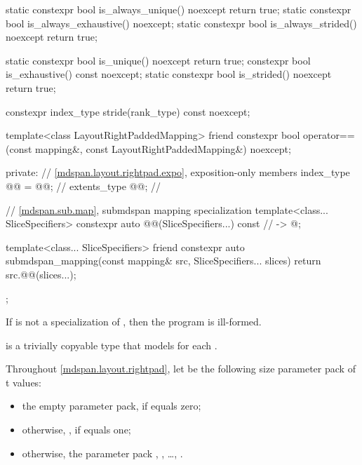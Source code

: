 \begin{codeblock}
{{    static constexpr bool is_always_unique() noexcept { return true; }
    static constexpr bool is_always_exhaustive() noexcept;
    static constexpr bool is_always_strided() noexcept { return true; }

    static constexpr bool is_unique() noexcept { return true; }
    constexpr bool is_exhaustive() const noexcept;
    static constexpr bool is_strided() noexcept { return true; }

    constexpr index_type stride(rank_type) const noexcept;

    template<class LayoutRightPaddedMapping>
      friend constexpr bool operator==(const mapping&, const LayoutRightPaddedMapping&) noexcept;

  private:
    // \ref{mdspan.layout.rightpad.expo}, exposition-only members
    index_type @@ = @@;                         // \expos
    extents_type @@{};                                               // \expos

    // \ref{mdspan.sub.map}, submdspan mapping specialization
    template<class... SliceSpecifiers>
      constexpr auto @@(SliceSpecifiers...) const     // \expos
        -> @\seebelow@;

    template<class... SliceSpecifiers>
      friend constexpr auto submdspan_mapping(const mapping& src, SliceSpecifiers... slices) {
      return src.@@(slices...);
    }
  };
}
\end{codeblock}

\pnum
If  is not a specialization of ,
then the program is ill-formed.

\pnum
{} is a trivially copyable type
that models  for each .

\pnum
Throughout \ref{mdspan.layout.rightpad},
let  be the following
size  parameter pack of t values:
\begin{itemize}
\item
the empty parameter pack, if  equals zero;
\item
\tcode otherwise, , if  equals one;
\item
otherwise, the parameter pack , , \ldots, .
\end{itemize}

